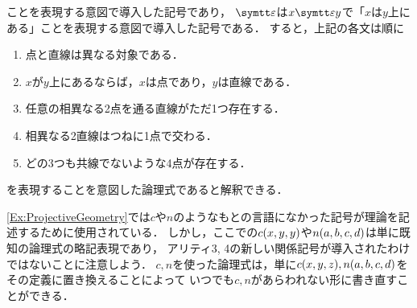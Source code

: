 \begin{Ex}
	ことを表現する意図で導入した記号であり，
	\(\LiesOn\)は\(x \LiesOn y\)で「\(x\)は\(y\)上にある」ことを表現する意図で導入した記号である．
	すると，上記の各文は順に
	\begin{enumerate}
		\item 点と直線は異なる対象である．
		\item \(x\)が\(y\)上にあるならば，\(x\)は点であり，\(y\)は直線である．
		\item 任意の相異なる2点を通る直線がただ1つ存在する．
		\item 相異なる2直線はつねに1点で交わる．
		\item どの3つも共線でないような4点が存在する．
	\end{enumerate}
	を表現することを意図した論理式であると解釈できる．
\end{Ex}

\begin{Note}
	\cref{Ex:ProjectiveGeometry}では\(c\)や\(n\)のようなもとの言語になかった記号が理論を記述するために使用されている．
	しかし，ここでの\(\apply{c}{x, y, y}\)や\(\apply{n}{a, b, c, d}\)は単に既知の論理式の略記表現であり，
	アリティ3, 4の新しい関係記号が導入されたわけではないことに注意しよう．
	\(c, n\)を使った論理式は，単に\(\apply{c}{x, y, z}, \apply{n}{a, b, c, d}\)をその定義に置き換えることによって
	いつでも\(c, n\)があらわれない形に書き直すことができる．
\end{Note}

